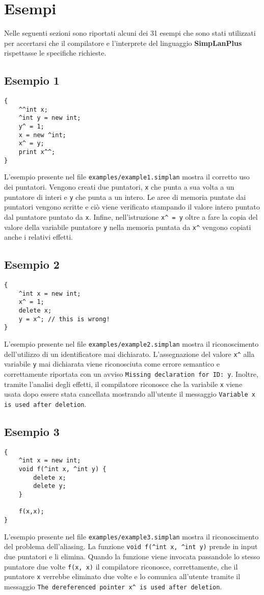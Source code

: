 \documentclass[../report.tex]{subfiles}
\begin{document}
\chapter{Esempi}\label{c:esempi}
Nelle seguenti sezioni sono riportati alcuni dei 31 esempi che sono stati utilizzati per accertarsi che il compilatore e l'interprete del linguaggio \textbf{SimpLanPlus} rispettasse le specifiche richieste.
\section{Esempio 1}\label{s:esempio1}
\begin{lstlisting}
{
    ^^int x;
    ^int y = new int;
    y^ = 1;
    x = new ^int;
    x^ = y;
    print x^^;
}
\end{lstlisting}
L'esempio presente nel file \verb|examples/example1.simplan| mostra il corretto uso dei puntatori.
Vengono creati due puntatori, \verb|x| che punta a sua volta a un puntatore di interi e \verb|y| che punta a un intero.
Le aree di memoria puntate dai puntatori vengono scritte e ciò viene verificato stampando il valore intero puntato dal puntatore puntato da \verb|x|.
Infine, nell'istruzione \verb|x^ = y| oltre a fare la copia del valore della variabile puntatore \verb|y| nella memoria puntata da \verb|x^| vengono copiati anche i relativi effetti.

\section{Esempio 2}\label{s:esempio2}
\begin{lstlisting}
{
    ^int x = new int;
    x^ = 1;
    delete x;
    y = x^; // this is wrong!
}
\end{lstlisting}
L'esempio presente nel file \verb|examples/example2.simplan| mostra il riconoscimento dell'utilizzo di un identificatore mai dichiarato.
L'assegnazione del valore \verb|x^| alla variabile \verb|y| mai dichiarata viene riconosciuta come errore semantico e correttamente riportata con un avviso \verb|Missing declaration for ID: y|.
Inoltre, tramite l'analisi degli effetti, il compilatore riconosce che la variabile \verb|x| viene usata dopo essere stata cancellata mostrando all'utente il messaggio \verb|Variable x is used after deletion|.

\section{Esempio 3}\label{s:esempio3}
\begin{lstlisting}
{
    ^int x = new int;
    void f(^int x, ^int y) {
        delete x;
        delete y;
    }

    f(x,x);
}
\end{lstlisting}
L'esempio presente nel file \verb|examples/example3.simplan| mostra il riconoscimento del problema dell'aliasing.
La funzione \verb|void f(^int x, ^int y)| prende in input due puntatori e li elimina.
Quando la funzione viene invocata passandole lo stesso puntatore due volte \verb|f(x, x)| il compilatore riconosce, correttamente, che il puntatore \verb|x| verrebbe eliminato due volte e lo comunica all'utente tramite il messaggio \verb|The dereferenced pointer x^ is used after deletion|.
\end{document}
